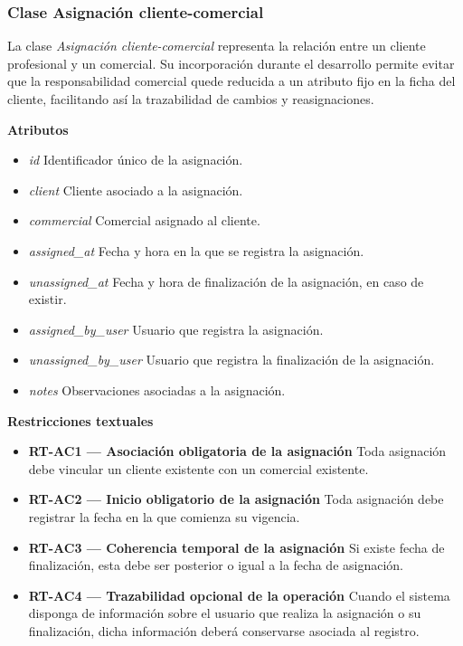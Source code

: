 \subsubsection{Clase Asignación cliente-comercial}

La clase \textit{Asignación cliente-comercial} representa la relación entre un cliente profesional y un comercial. Su incorporación durante el desarrollo permite evitar que la responsabilidad comercial quede reducida a un atributo fijo en la ficha del cliente, facilitando así la trazabilidad de cambios y reasignaciones.

\textbf{Atributos}

\begin{itemize}
      \item \textit{id} Identificador único de la asignación.
      \item \textit{client} Cliente asociado a la asignación.
      \item \textit{commercial} Comercial asignado al cliente.
      \item \textit{assigned\_at} Fecha y hora en la que se registra la asignación.
      \item \textit{unassigned\_at} Fecha y hora de finalización de la asignación, en caso de existir.
      \item \textit{assigned\_by\_user} Usuario que registra la asignación.
      \item \textit{unassigned\_by\_user} Usuario que registra la finalización de la asignación.
      \item \textit{notes} Observaciones asociadas a la asignación.
\end{itemize}

\textbf{Restricciones textuales}

\begin{itemize}
      \item \textbf{RT-AC1 — Asociación obligatoria de la asignación} Toda asignación debe vincular un cliente existente con un comercial existente.
      \item \textbf{RT-AC2 — Inicio obligatorio de la asignación} Toda asignación debe registrar la fecha en la que comienza su vigencia.
      \item \textbf{RT-AC3 — Coherencia temporal de la asignación} Si existe fecha de finalización, esta debe ser posterior o igual a la fecha de asignación.
      \item \textbf{RT-AC4 — Trazabilidad opcional de la operación} Cuando el sistema disponga de información sobre el usuario que realiza la asignación o su finalización, dicha información deberá conservarse asociada al registro.
\end{itemize}

